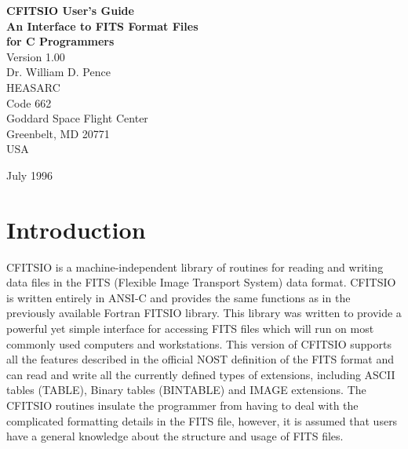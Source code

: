 %
\oddsidemargin=0.25in
\evensidemargin=0.00in
\textwidth=6.0in
\topmargin=0.0in
\textheight=8.75in
\parindent=0cm
\parskip=0.2cm


\begin{titlepage}
\normalsize
\vspace*{4.6cm}
\begin{center}
{\Huge \bf CFITSIO User's Guide}\\
\medskip 
\medskip 
\medskip 
\medskip 
{\LARGE \bf An Interface to FITS Format Files}\\
\medskip
\medskip
{\LARGE \bf for C Programmers}\\
\medskip
\medskip
\medskip
\medskip
{\Large Version 1.00\\}
\bigskip
\vskip 3.0cm
{Dr. William D. Pence\\
HEASARC\\
Code 662\\
Goddard Space Flight Center\\
Greenbelt, MD 20771\\
USA}

\vfill
\bigskip
{\Large July 1996\\}
\end{center}
\vfill
\end{titlepage}

\begin{titlepage}
\vspace*{7.6cm}
\vfill
\end{titlepage}


\tableofcontents

\chapter{Introduction }

CFITSIO is a machine-independent library of routines for reading and
writing data files in the FITS (Flexible Image Transport System) data
format. CFITSIO is written entirely in ANSI-C and provides the same
functions as in the previously available Fortran FITSIO library. This
library was written to provide a powerful yet simple interface for
accessing FITS files which will run on most commonly used computers and
workstations. This version of CFITSIO supports all the features
described in the official NOST definition of the FITS format and can
read and write all the currently defined types of extensions, including
ASCII tables (TABLE), Binary tables (BINTABLE) and IMAGE extensions.
The CFITSIO routines insulate the programmer from having to deal with
the complicated formatting details in the FITS file, however, it is
assumed that users have a general knowledge about the structure and
usage of FITS files.

